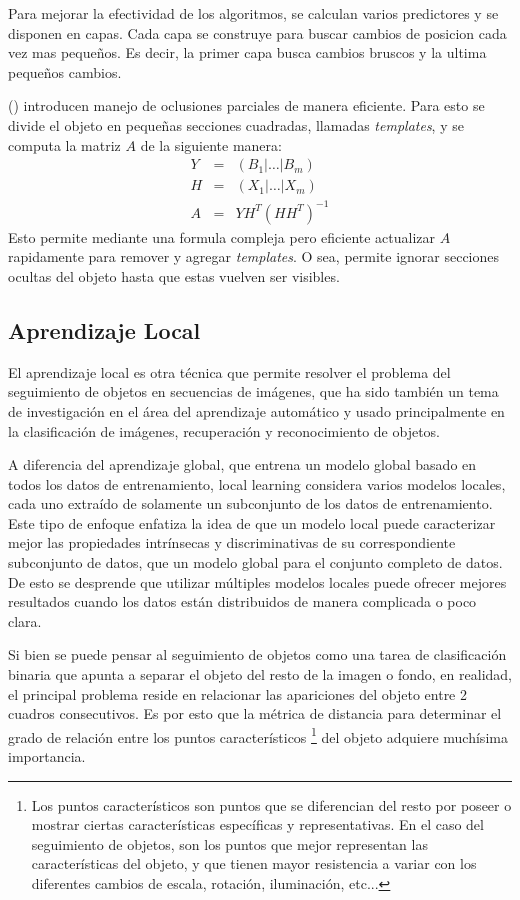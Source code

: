 \documentclass[a4paper,10pt]{article}
\begin{document}
Para mejorar la efectividad de los algoritmos, se calculan varios predictores y se disponen en capas.
Cada capa se construye para buscar cambios de posicion cada vez mas pequeños.
Es decir, la primer capa busca cambios bruscos y la ultima pequeños cambios.

\citeauthor*{alp} (\cite{alp}) introducen manejo de oclusiones parciales de manera eficiente.
Para esto se divide el objeto en pequeñas secciones cuadradas, llamadas \textit{templates}, y se computa la matriz $A$ de la siguiente manera:
\begin{eqnarray*}
    Y &=& \left( B_1 \lvert \dots \lvert B_m \right) \\
    H &=& \left( X_1 \lvert \dots \lvert X_m \right) \\
    A &=& Y H^T(HH^T)^{-1}
\end{eqnarray*}
Esto permite mediante una formula compleja pero eficiente actualizar $A$ rapidamente para remover y agregar \textit{templates}.
O sea, permite ignorar secciones ocultas del objeto hasta que estas vuelven ser visibles.

\subsection{Aprendizaje Local}

El aprendizaje local es otra técnica que permite resolver el problema del seguimiento de objetos en secuencias de imágenes,
que ha sido también un tema de investigación en el área del aprendizaje automático \cite{local-learning-machine-learning} y usado principalmente en la clasificación 
de imágenes, recuperación y reconocimiento de objetos.

A diferencia del aprendizaje global, que entrena un modelo global basado en 
todos los datos de entrenamiento, local learning considera varios modelos locales, cada uno extraído de solamente un subconjunto de los datos de entrenamiento.
Este tipo de enfoque enfatiza la idea de que un modelo local puede caracterizar mejor las propiedades intrínsecas y discriminativas de su correspondiente 
subconjunto de datos, que un modelo global para el conjunto completo de datos. De esto se desprende que utilizar múltiples modelos locales puede ofrecer 
mejores resultados cuando los datos están distribuidos de manera complicada o poco clara.

Si bien se puede pensar al seguimiento de objetos como una tarea de clasificación binaria 
que apunta a separar el objeto del resto de la imagen o fondo, en realidad, el principal
problema reside en relacionar las apariciones del objeto entre 2 cuadros
consecutivos. Es por esto que la métrica de distancia para determinar el grado de 
relación entre los puntos característicos \footnote{Los puntos característicos son puntos que se diferencian del resto por poseer o mostrar
ciertas características específicas y representativas. En el caso del seguimiento de objetos, son los puntos que mejor representan las características
del objeto, y que tienen mayor resistencia a variar con los diferentes cambios de escala, rotación, iluminación, etc...}
del objeto adquiere muchísima importancia.
\end{document}
